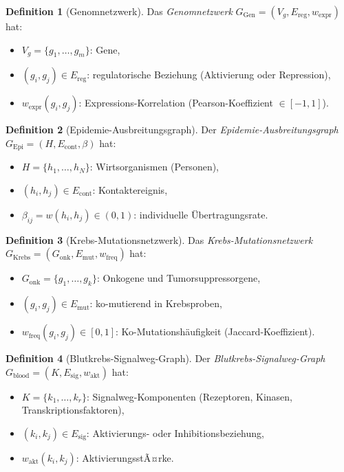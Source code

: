 ﻿\documentclass[a4paper,12pt]{article}
\theoremstyle{plain}
\theoremstyle{definition}
\newtheorem{definition}{Definition}
\theoremstyle{remark}
\newcommand{\Ggen}{G_{\mathrm{Gen}}}
\newcommand{\Gepi}{G_{\mathrm{Epi}}}
\newcommand{\Gkrebs}{G_{\mathrm{Krebs}}}
\newcommand{\Gblood}{G_{\mathrm{blood}}}
\begin{document}
\begin{definition}[Genomnetzwerk]
\label{def:gen}
Das \emph{Genomnetzwerk} $\Ggen = (V_g, E_{\mathrm{reg}}, w_{\mathrm{expr}})$
hat:
\begin{itemize}
    \item $V_g = \{g_1, \ldots, g_m\}$: Gene,
    \item $(g_i, g_j) \in E_{\mathrm{reg}}$:
          regulatorische Beziehung (Aktivierung oder Repression),
    \item $w_{\mathrm{expr}}(g_i, g_j)$: Expressions-Korrelation
          (Pearson-Koeffizient $\in [-1,1]$).
\end{itemize}
\end{definition}

\begin{definition}[Epidemie-Ausbreitungsgraph]
\label{def:epi}
Der \emph{Epidemie-Ausbreitungsgraph}
$\Gepi = (H, E_{\mathrm{cont}}, \beta)$ hat:
\begin{itemize}
    \item $H = \{h_1, \ldots, h_N\}$: Wirtsorganismen (Personen),
    \item $(h_i, h_j) \in E_{\mathrm{cont}}$: Kontaktereignis,
    \item $\beta_{ij} = w(h_i, h_j) \in (0,1)$:
          individuelle \"Ubertragungsrate.
\end{itemize}
\end{definition}

\begin{definition}[Krebs-Mutationsnetzwerk]
\label{def:krebs}
Das \emph{Krebs-Mutationsnetzwerk}
$\Gkrebs = (G_{\mathrm{onk}}, E_{\mathrm{mut}}, w_{\mathrm{freq}})$ hat:
\begin{itemize}
    \item $G_{\mathrm{onk}} = \{g_1, \ldots, g_k\}$:
          Onkogene und Tumorsuppressorgene,
    \item $(g_i, g_j) \in E_{\mathrm{mut}}$:
          ko-mutierend in Krebsproben,
    \item $w_{\mathrm{freq}}(g_i, g_j) \in [0,1]$:
          Ko-Mutationsh\"aufigkeit (Jaccard-Koeffizient).
\end{itemize}
\end{definition}

\begin{definition}[Blutkrebs-Signalweg-Graph]
\label{def:blood}
Der \emph{Blutkrebs-Signalweg-Graph}
$\Gblood = (K, E_{\mathrm{sig}}, w_{\mathrm{akt}})$ hat:
\begin{itemize}
    \item $K = \{k_1, \ldots, k_r\}$: Signalweg-Komponenten
          (Rezeptoren, Kinasen, Transkriptionsfaktoren),
    \item $(k_i, k_j) \in E_{\mathrm{sig}}$:
          Aktivierungs- oder Inhibitionsbeziehung,
    \item $w_{\mathrm{akt}}(k_i, k_j)$: AktivierungsstÃ¤rke.
\end{itemize}
\end{definition}
\end{document}
